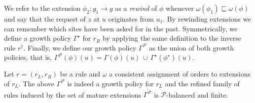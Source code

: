 \documentclass[a4paper,12pt]{article}
\newcommand{\gp}{\Gamma}
\newcommand{\shapes}{\mathcal{P}}
\newcommand{\comatch}[1]{#1^\star}
\newcommand{\inv}[1]{#1^\dagger}
\newcommand{\ord}{\omega}
\newcommand{\egp}{\gp^\shapes}
\begin{document}
We refer to the extension $\phi_2: g_1 \to g$
as a \emph{rewind} of $\phi$
whenever $\ord(\phi_1) \sqsubseteq \ord(\phi)$
and say that the request of $z$ at $u$ originates from $u_1$.
By rewinding extensions we can remember
which sites have been asked for in the past.
Symmetrically, we define a growth policy $\comatch{\gp}$ for $r_R$
by applying the same definition to the inverse rule $\inv{r}$.
Finally, we define our growth policy $\egp$
as the union of both growth policies,
that is, $\gp^\shapes(\phi)(u) = \gp(\phi)(u)
\,\cup\, \comatch{\gp}(\comatch{\phi})(u)$.

\begin{theorem}
  Let $r = (r_L,r_R)$ be a rule
  and $\ord$ a consistent assignment of orders
  to extensions of $r_L$.
  The above $\gp^\shapes$ is indeed a growth policy for $r_L$
  and the refined family of rules
  induced by the set of mature extensions $\overline{\gp^\shapes}$
  is $\shapes$-balanced and finite.
\end{theorem}
\end{document}
